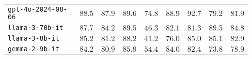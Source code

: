 \begin{table*}
{\begin{tabular}{lcccccccc}
\texttt{gpt-4o-2024-08-06}      & $88.5$                                                                                            & $\mathbf{87.9}$                                                                                                   & $\mathbf{89.6}$                                                                                                 & $\mathbf{74.8}$                                                                                                                     & $88.9$              & $92.7$           & $79.2$                 & $81.9$                                                                                                   \\
\texttt{llama-3-70b-it}         & $87.7$                                                                                            & $84.2$                                                                                                   & $89.5$                                                                                                 & $46.3$                                                                                                                     & $82.1$              & $81.3$           & $89.5$                 & $\mathbf{84.8}$                                                                                                   \\
\texttt{llama-3-8b-it}          & $85.2$                                                                                            & $81.2$                                                                                                   & $88.2$                                                                                                 & $41.2$                                                                                                                     & $76.0$              & $85.0$           & $85.1$                 & $82.9$                                                                                                   \\
\texttt{gemma-2-9b-it}          & $84.2$                                                                                            & $80.9$                                                                                                   & $85.9$                                                                                                 & $54.4$                                                                                                                     & $84.0$              & $82.4$           & $73.8$                 & $78.9$                                                                                                   \\

\end{tabular}}
\end{table*}
